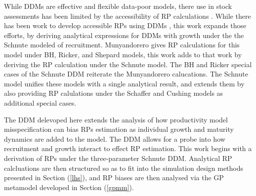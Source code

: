While DDMs are effective and flexible data-poor models, there use in stock 
assessments has been limited by the accessibility of RP calculations \cite{munyandorero_analytical_2023, sedar_stock_2010}. 
While there has been work to develop accessible RPs using DDMs \cite{dick_depletion-based_2011, munyandorero_analytical_2023}, 
this work expands those efforts, by deriving analytical expressions for DDMs 
with growth under the the Schnute modeled of recruitment. 
Munyandorero \cite{munyandorero_analytical_2023} gives RP calculations for this model 
under BH, Ricker, and Shepard models, this work adds to that work by deriving 
the RP calculation under the Schnute model. The BH and Ricker special cases of the 
Schnute DDM reiterate the Munyandorero calucations. The Schnute model unifies these 
models with a single analytical result, and extends them by also providing RP calulations 
under the Schaffer {\color{red}and Cushing models} as additional special cases. 

%
The DDM delevoped here extends the analysis of how productivity model misspecification 
can bias RPs estimation as individual growth and maturity dynamics are added to the model. 
The DDM allows for a probe into how recruitment and growth interact to effect RP estimation.
This work begins with a derivation of RPs under the three-parameter Schnute 
DDM. Analytical RP calcluations are then structured so as to fit into the 
simulation design methods presented in Section (\ref{lhs}), and RP biases are 
then analysed via the GP metamodel developed in Section (\ref{gpmm}).


